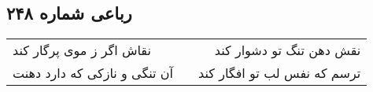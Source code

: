 \begin{center}
\section*{رباعی شماره ۲۴۸}
\label{sec:sh248}
\begin{longtable}{l p{0.5cm} r}
نقاش اگر ز موی پرگار کند
&&
نقش دهن تنگ تو دشوار کند
\\
آن تنگی و نازکی که دارد دهنت
&&
ترسم که نفس لب تو افگار کند
\\
\end{longtable}
\end{center}
